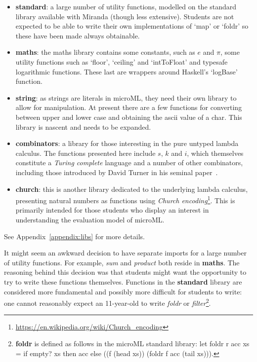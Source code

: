 \documentclass[12pt, a4paper]{report}
\begin{document}
\begin{itemize}
    \item \textbf{standard}: a large number of utility functions, modelled on the standard library available
        with Miranda (though less extensive). Students are not expected to be able to write their
        own implementations of `map' or `foldr' so these have been made always obtainable.
    \item \textbf{maths}: the maths library contains some constants, such as $e$ and $\pi$, some utility
        functions such as `floor', `ceiling' and `intToFloat' and typesafe logarithmic functions.
        These last are wrappers around Haskell's `logBase' function.
    \item \textbf{string}: as strings are literals in microML, they need their own library to allow for
        manipulation. At present there are a few functions for converting between upper and lower
        case and obtaining the ascii value of a char. This library is nascent and needs to be
        expanded.
    \item \textbf{combinators}: a library for those interesting in the pure untyped lambda calculus. The
        functions presented here include $s$, $k$ and $i$, which themselves constitute a
        \textit{Turing complete} language and a number of other combinators, including those
        introduced by David Turner in his seminal paper~\cite{TUR79a}.
    \item \textbf{church}: this is another library dedicated to the underlying lambda calculus, presenting
        natural numbers as functions using \textit{Church encoding}\footnote{\url{https://en.wikipedia.org/wiki/Church_encoding}}.
        This is primarily intended for those students who display an interest in understanding the
        evaluation model of microML\@.
\end{itemize}

See Appendix~\ref{appendix:libs} for more details.

It might seem an awkward decision to have separate imports for a large number of utility functions.
For example, \textit{sum} and \textit{product} both reside in \textbf{maths}. The reasoning
behind this decision was that students might want the opportunity to try to write these functions
themselves. Functions in the \textbf{standard} library are considered more fundamental and possibly
more difficult for students to write: one cannot reasonably expect an 11-year-old to write
\textit{foldr} or \textit{filter}\footnote{\textbf{foldr} is defined as follows in the microML standard
library\@: let foldr r acc xs = if empty? xs then acc else ((f (head xs)) (foldr f acc (tail xs))).}.
\end{document}
